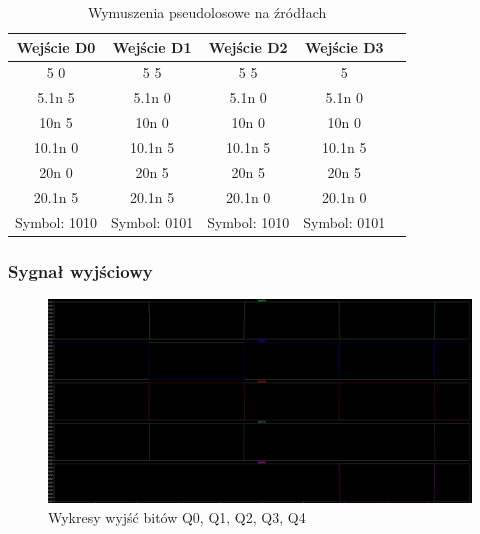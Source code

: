 \documentclass{article}
\begin{document}
\begin{table}[ht]
    \centering 
    \caption{Wymuszenia pseudolosowe na źródłach}
    \vspace{20pt} 
    \label{tab:tabela} 
    \begin{tabular}{|c|c|c|c|c|} 
    \hline 
   \textbf{Wejście D0} & \textbf{Wejście D1} & \textbf{Wejście D2} & \textbf{Wejście D3} \\ \hline %
    5 0 & 5 5 & 5 5 & 5 \\ \hline %
    5.1n 5 & 5.1n 0 & 5.1n 0 & 5.1n 0 \\ \hline %
    10n 5 & 10n 0 & 10n 0 & 10n 0\\ \hline %
    10.1n 0 & 10.1n 5 & 10.1n 5 & 10.1n 5 \\ \hline %
    20n 0 & 20n 5 & 20n 5 & 20n 5 \\ \hline %
    20.1n 5 & 20.1n 5 & 20.1n 0 & 20.1n 0 \\ \hline %
    Symbol: 1010 & Symbol: 0101 & Symbol: 1010 & Symbol: 0101 \\ \hline %
    \end{tabular}
    \end{table}

\newpage

\subsubsection{Sygnał wyjściowy}
\begin{figure}[ht]
    \centering
    \begin{adjustbox}{center}
        \includegraphics[width=1.3\textwidth]{wyjsciowe.jpg}
    \end{adjustbox}
    \caption{Wykresy wyjść bitów Q0, Q1, Q2, Q3, Q4}
    \label{fig:mojobrazek}
\end{figure}
\end{document}
